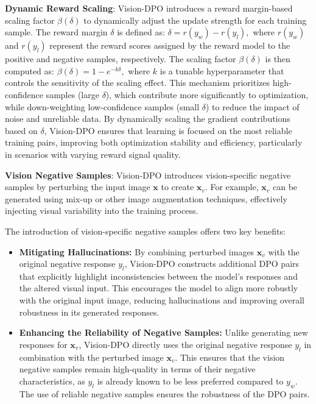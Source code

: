 \textbf{Dynamic Reward Scaling}: Vision-DPO introduces a reward margin-based scaling factor $\beta(\delta)$ to dynamically adjust the update strength for each training sample. The reward margin $\delta$ is defined as:
$
\delta = r(y_w) - r(y_l),
$
where $r(y_w)$ and $r(y_l)$ represent the reward scores assigned by the reward model to the positive and negative samples, respectively. The scaling factor $\beta(\delta)$ is then computed as:
$
\beta(\delta) = 1 - e^{-k \delta},
$
where $k$ is a tunable hyperparameter that controls the sensitivity of the scaling effect. This mechanism prioritizes high-confidence samples (large $\delta$), which contribute more significantly to optimization, while down-weighting low-confidence samples (small $\delta$) to reduce the impact of noise and unreliable data. By dynamically scaling the gradient contributions based on $\delta$, Vision-DPO ensures that learning is focused on the most reliable training pairs, improving both optimization stability and efficiency, particularly in scenarios with varying reward signal quality.

\textbf{Vision Negative Samples}: Vision-DPO introduces vision-specific negative samples by perturbing the input image $\mathbf{x}$ to create $\mathbf{x}_v$. For example, $\mathbf{x}_v$ can be generated using mix-up or other image augmentation techniques, effectively injecting visual variability into the training process.

The introduction of vision-specific negative samples offers two key benefits:
\begin{itemize}
    \item \textbf{Mitigating Hallucinations:}  
    By combining perturbed images $\mathbf{x}_v$ with the original negative response $y_l$, Vision-DPO constructs additional DPO pairs that explicitly highlight inconsistencies between the model's responses and the altered visual input. This encourages the model to align more robustly with the original input image,  reducing hallucinations and improving overall robustness in its generated responses.
    \item \textbf{Enhancing the Reliability of Negative Samples:}  
    Unlike generating new responses for $\mathbf{x}_v$, Vision-DPO directly uses the original negative response $y_l$ in combination with the perturbed image $\mathbf{x}_v$. This ensures that the vision negative samples remain high-quality in terms of their negative characteristics, as $y_l$ is already known to be less preferred compared to $y_w$. The use of reliable negative samples ensures the robustness of the DPO pairs.
\end{itemize}

